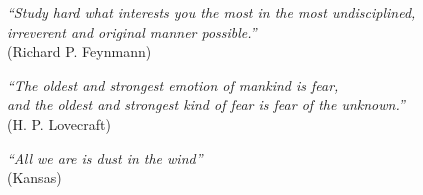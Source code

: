 \documentclass[
	12pt,				%
	openright,			%
	twoside,			%
	a4paper,			%
	english,			%
	french,				%
	spanish,			%
	brazil				%
	]{abntex2}
\begin{document}
\begin{epigrafe}
    \vspace*{\fill}
	\begin{flushright}
		\textit{``Study hard what interests you the most in the most undisciplined,\\
		irreverent and original manner possible.''}\\
		(Richard P. Feynmann)
		
        
        \textit{``The oldest and strongest emotion of mankind is fear, \\
        and the oldest and strongest kind of fear is fear of the unknown.''}\\
        (H. P. Lovecraft)
        
        
        \textit{``All we are is dust in the wind''}\\
        (Kansas)
        
        
	\end{flushright}
\end{epigrafe}

\end{document}
